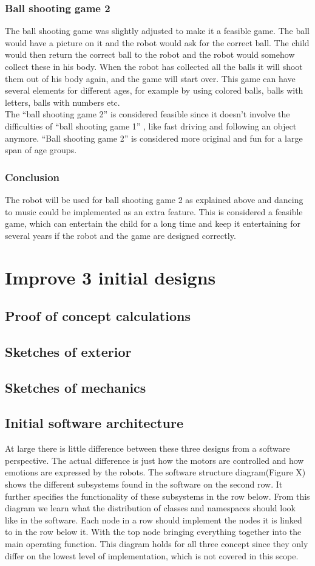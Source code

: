 \documentclass[11pt,twoside,a4paper]{report}
\begin{document}
\subsection{Ball shooting game 2}
The ball shooting game was slightly adjusted to make it a feasible game. The ball would have a picture on it and the robot would ask for the correct ball. The child would then return the correct ball to the robot and the robot would somehow collect these in his body. When the robot has collected all the balls it will shoot them out of his body again, and the game will start over. This game can have several elements for different ages, for example by using colored balls, balls with letters, balls with numbers etc. \\
The “ball shooting game 2” is considered feasible since it doesn’t involve the difficulties of “ball shooting game 1” , like fast driving and following an object anymore. “Ball shooting game 2” is considered more original and fun for a large span of age groups.
\subsection{Conclusion}
The robot will be used for ball shooting game 2 as explained above and dancing to music could be implemented as an extra feature. This is considered a feasible game, which can entertain the child for a long time and keep it entertaining for several years if the robot and the game are designed correctly.

\chapter{Improve 3 initial designs}
\section{Proof of concept calculations}
\section{Sketches of exterior}
\section{Sketches of mechanics}
\section{Initial software architecture}
At large there is little difference between these three designs from a software perspective. The actual difference is just how the motors are controlled and how emotions are expressed by the robots. 
The software structure diagram(Figure X) shows the different subsystems found in the software on the second row. It further specifies the functionality of these subsystems in the row below. From this diagram we learn what the distribution of classes and namespaces should look like in the software. Each node in a row should implement the nodes it is linked to in the row below it. With the top node bringing everything together into the main operating function. This diagram holds for all three concept since they only differ on the lowest level of implementation, which is not covered in this scope.
\end{document}
